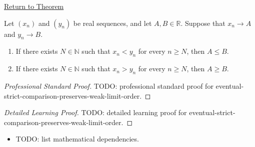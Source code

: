 \newpage
{}
\label{prf:eventual-strict-comparison-preserves-weak-limit-order}

\begin{remark*}[Return]
\hyperref[thm:eventual-strict-comparison-preserves-weak-limit-order]{Return to Theorem}
\end{remark*}

\begin{theorem*}
Let $(x_n)$ and $(y_n)$ be real sequences, and let $A,B\in\mathbb{R}$.
Suppose that $x_n\to A$ and $y_n\to B$.
\begin{enumerate}[label=(\alph*)]
  \item If there exists $N\in\mathbb{N}$ such that $x_n<y_n$ for every
  $n\ge N$, then $A\le B$.
  \item If there exists $N\in\mathbb{N}$ such that $x_n>y_n$ for every
  $n\ge N$, then $A\ge B$.
\end{enumerate}

\smallskip
\noindent
\end{theorem*}

\begin{proof}[Professional Standard Proof]
\LRAProofBodyStart
TODO: professional standard proof for eventual-strict-comparison-preserves-weak-limit-order.
\end{proof}

\begin{proof}[Detailed Learning Proof]
\LRAProofBodyStart
TODO: detailed learning proof for eventual-strict-comparison-preserves-weak-limit-order.
\end{proof}

\begin{remark*}
\end{remark*}

\begin{dependencies}
\begin{itemize}
  \item TODO: list mathematical dependencies.
\end{itemize}
\end{dependencies}

\clearpage
